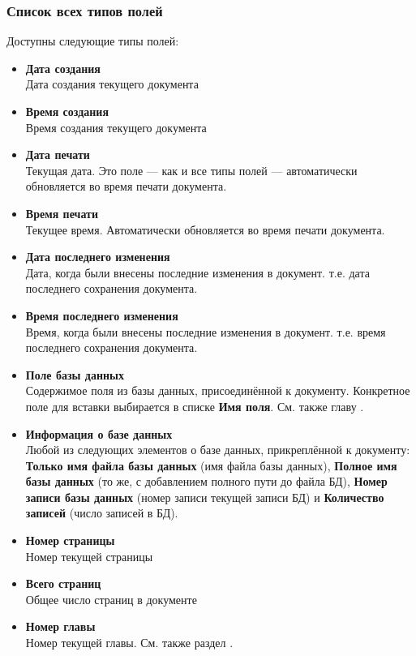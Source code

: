 ﻿\documentclass[a4paper,10pt]{article}
\begin{document}
\subsubsection{Список всех типов полей}
Доступны следующие типы полей:
\begin{itemize}
 \item \textbf{Дата создания}\\
 Дата создания текущего документа
 \item \textbf{Время создания}\\
 Время создания текущего документа
 \item \textbf{Дата печати}\\
 Текущая дата. Это поле — как и все типы полей — автоматически обновляется во время печати документа.
 \item \textbf{Время печати}\\
 Текущее время. Автоматически обновляется во время печати документа.
 \item \textbf{Дата последнего изменения}\\
 Дата, когда были внесены последние изменения в документ. т.е. дата последнего сохранения документа.
 \item \textbf{Время последнего изменения}\\
 Время, когда были внесены последние изменения в документ. т.е. время последнего сохранения документа.
 \item \textbf{Поле базы данных}\\
 Содержимое поля из базы данных, присоединённой к документу. Конкретное поле для вставки выбирается в списке \textbf{Имя поля}. См. также главу .
 \item \textbf{Информация о базе данных}\\
 Любой из следующих элементов о базе данных, прикреплённой к документу: \textbf{Только имя файла базы данных} (имя файла базы данных), \textbf{Полное имя базы данных} (то же, с добавлением полного пути до файла БД), \textbf{Номер записи базы данных} (номер записи текущей записи БД) и \textbf{Количество записей} (число записей в БД).
 \item \textbf{Номер страницы}\\
 Номер текущей страницы
 \item \textbf{Всего страниц}\\
 Общее число страниц в документе
 \item \textbf{Номер главы}\\
 Номер текущей главы. См. также раздел .

\end{itemize}
\end{document}
